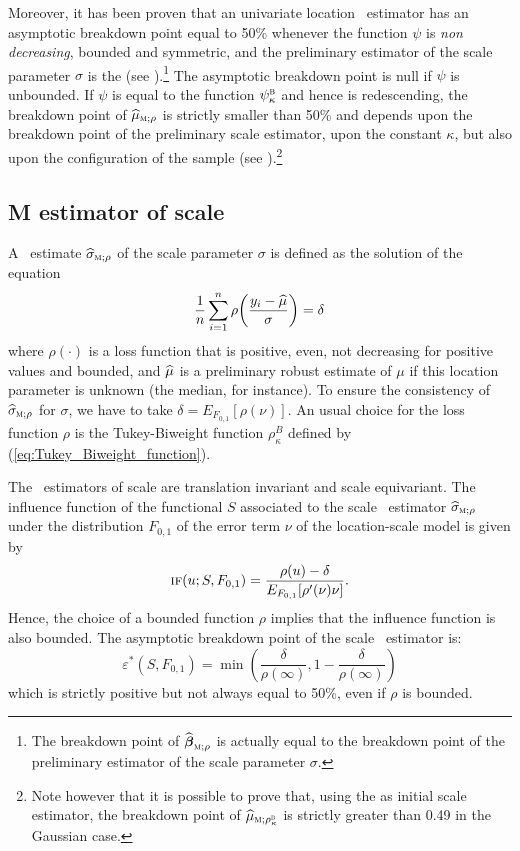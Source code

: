 Moreover, it has been proven that an univariate location ~estimator has
an asymptotic breakdown point equal to 50\% whenever the function $\psi$ is
\emph{non decreasing}, bounded and symmetric, and the preliminary estimator of
the scale parameter $\sigma$ is the  (see
\citealp[54]{Huber:2009}).\footnote{The breakdown point of
$\sthat{\boldsymbol\beta}_{\stsc{M};\rho}$ is actually equal to the breakdown
point of the preliminary estimator of the scale parameter $\sigma$.} The
asymptotic breakdown point is null if $\psi$ is unbounded. If $\psi$ is equal
to the function $\psi_{\kappa}^{\stsc{B}}$ and hence is redescending, the
breakdown point of $\sthat{\mu}_{\stsc{M};\rho}$ is strictly smaller than 50\%
and depends upon the breakdown point of the preliminary scale estimator, upon
the constant $\kappa$, but also upon the configuration of the sample (see
\citealp[78]{maronna:etal:2006}).\footnote{Note however that it is possible to
prove that, using the  as initial scale estimator, the breakdown
point of $\sthat{\mu}_{\stsc{M};\rho_{\kappa}^{\stsc{B}}}$ is strictly greater
than 0.49 in the Gaussian case.}

\subsection{M estimator of scale}

A ~estimate $\sthat{\sigma}_{\stsc{M};\rho}$ of the scale parameter
$\sigma$ is defined as the solution of the equation
%
\begin{equation}
    \label{eq:M_scale_loc_equation}
    \frac{1}{n} \sum_{i=1}^{n} \rho\left(\frac{y_i-\sthat{\mu}}{\sigma}\right) = \delta
\end{equation}
%
where $\rho(\cdot)$ is a loss function that is positive, even, not decreasing
for positive values and bounded, and $\widehat{\mu}$ is a preliminary robust
estimate of $\mu$ if this location parameter is unknown (the median, for
instance). To ensure the consistency of $\sthat{\sigma}_{\stsc{M};\rho}$ for
$\sigma$, we have to take $\delta = E_{F_{0,1}}[\rho(\nu)]$. An usual choice
for the loss function $\rho$ is the Tukey-Biweight function $\rho_{\kappa}^{B}$
defined by (\ref{eq:Tukey_Biweight_function}).

The ~estimators of scale are translation invariant and scale
equivariant. The influence function of the functional $S$ associated to the
scale ~estimator $\sthat{\sigma}_{\stsc{M};\rho}$ under the
distribution $F_{0,1}$ of the error term $\nu$ of the location-scale model is
given by
\[
    \stsc{IF}(u;S,F_{0,1}) = \frac{\rho(u) -\delta}{E_{F_{0,1}}[\rho'(\nu)\nu]}.
\]
Hence, the choice of a bounded function $\rho$ implies that the influence
function is also bounded. The asymptotic breakdown point of the scale
~estimator is:
\[
    \varepsilon^*(S,F_{0,1}) = \min\left(\frac{\delta}{\rho(\infty)},
        1-\frac{\delta}{\rho(\infty)}\right)
\]
which is strictly positive but not always equal to 50\%, even if $\rho$ is
bounded.

